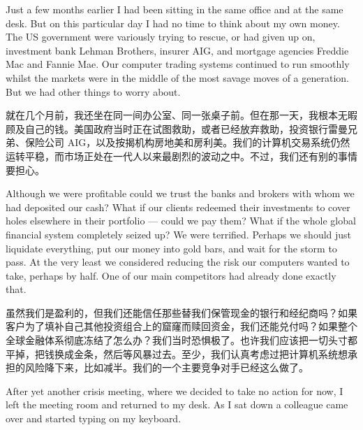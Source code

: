 
\begin{englishblock} Just a few months earlier I had been sitting in the same office and at the same desk. But on this particular day I had no time to think about my own money. The US government were variously trying to rescue, or had given up on, investment bank Lehman Brothers, insurer AIG, and mortgage agencies Freddie Mac and Fannie Mae. Our computer trading systems continued to run smoothly whilst the markets were in the middle of the most savage moves of a generation. But we had other things to worry about. \end{englishblock}

\begin{chineseblock}就在几个月前，我还坐在同一间办公室、同一张桌子前。但在那一天，我根本无暇顾及自己的钱。美国政府当时正在试图救助，或者已经放弃救助，投资银行雷曼兄弟、保险公司 AIG，以及按揭机构房地美和房利美。我们的计算机交易系统仍然运转平稳，而市场正处在一代人以来最剧烈的波动之中。不过，我们还有别的事情要担心。\end{chineseblock}

\bipairgap

\begin{englishblock} Although we were profitable could we trust the banks and brokers with whom we had deposited our cash? What if our clients redeemed their investments to cover holes elsewhere in their portfolio --- could we pay them? What if the whole global financial system completely seized up? We were terrified. Perhaps we should just liquidate everything, put our money into gold bars, and wait for the storm to pass. At the very least we considered reducing the risk our computers wanted to take, perhaps by half. One of our main competitors had already done exactly that. \end{englishblock}

\begin{chineseblock}虽然我们是盈利的，但我们还能信任那些替我们保管现金的银行和经纪商吗？如果客户为了填补自己其他投资组合上的窟窿而赎回资金，我们还能兑付吗？如果整个全球金融体系彻底冻结了怎么办？我们当时恐惧极了。也许我们应该把一切头寸都平掉，把钱换成金条，然后等风暴过去。至少，我们认真考虑过把计算机系统想承担的风险降下来，比如减半。我们的一个主要竞争对手已经这么做了。\end{chineseblock}

\bipairgap

\begin{englishblock} After yet another crisis meeting, where we decided to take no action for now, I left the meeting room and returned to my desk. As I sat down a colleague came over and started typing on my keyboard. \end{englishblock}

